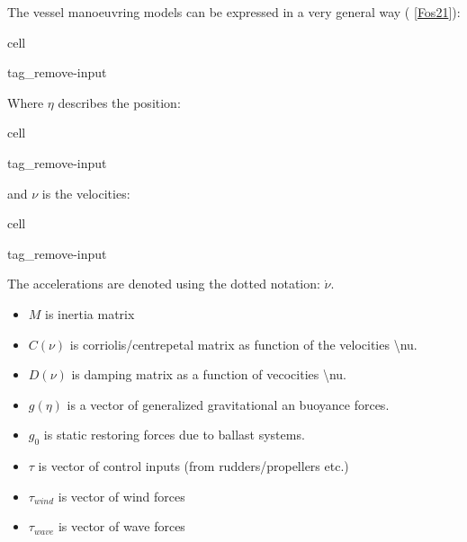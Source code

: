 \documentclass[review]{elsarticle}
\begin{document}
\sphinxAtStartPar
The vessel manoeuvring models can be expressed in a very general way ( {[}\hyperlink{cite.bibligraphy:id167}{Fos21}{]}):

\begin{sphinxuseclass}{cell}
\begin{sphinxuseclass}{tag_remove-input}
\end{sphinxuseclass}
\end{sphinxuseclass}
\sphinxAtStartPar
Where \(\eta\) describes the position:

\begin{sphinxuseclass}{cell}
\begin{sphinxuseclass}{tag_remove-input}
\end{sphinxuseclass}
\end{sphinxuseclass}
\sphinxAtStartPar
and \(\nu\) is the velocities:

\begin{sphinxuseclass}{cell}
\begin{sphinxuseclass}{tag_remove-input}
\end{sphinxuseclass}
\end{sphinxuseclass}
\sphinxAtStartPar
The accelerations are denoted using the dotted notation: \(\dot{\nu}\).
\begin{itemize}
\item {} 
\sphinxAtStartPar
\(M\) is inertia matrix

\item {} 
\sphinxAtStartPar
\(C(\nu)\) is corriolis/centrepetal matrix as function of the velocities \textbackslash{}nu.

\item {} 
\sphinxAtStartPar
\(D(\nu)\) is damping matrix as a function of vecocities \textbackslash{}nu.

\item {} 
\sphinxAtStartPar
\(g(\eta)\) is a vector of generalized gravitational an buoyance forces.

\item {} 
\sphinxAtStartPar
\(g_0\) is static restoring forces due to ballast systems.

\item {} 
\sphinxAtStartPar
\(\tau\) is vector of control inputs (from rudders/propellers etc.)

\item {} 
\sphinxAtStartPar
\(\tau_{wind}\) is vector of wind forces

\item {} 
\sphinxAtStartPar
\(\tau_{wave}\) is vector of wave forces

\end{itemize}
\end{document}
